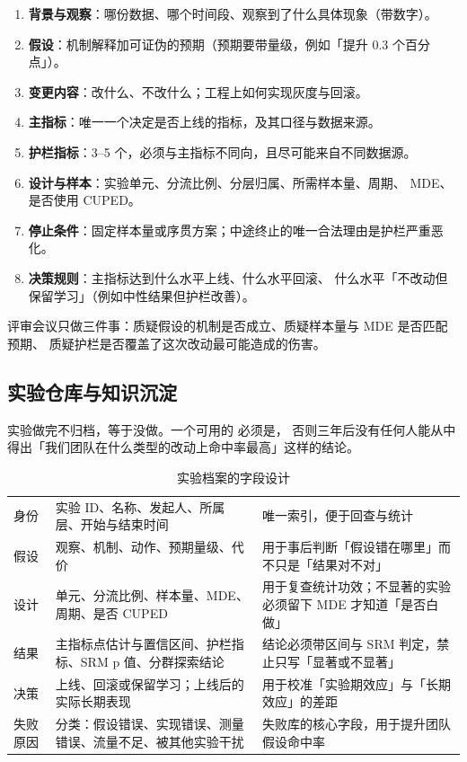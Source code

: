 \begin{toolbox}[一页纸实验文档模板]
\begin{enumerate}
  \item \textbf{背景与观察}：哪份数据、哪个时间段、观察到了什么具体现象（带数字）。
  \item \textbf{假设}：机制解释加可证伪的预期（预期要带量级，例如「提升 0.3 个百分点」）。
  \item \textbf{变更内容}：改什么、不改什么；工程上如何实现灰度与回滚。
  \item \textbf{主指标}：唯一一个决定是否上线的指标，及其口径与数据来源。
  \item \textbf{护栏指标}：3--5 个，必须与主指标不同向，且尽可能来自不同数据源。
  \item \textbf{设计与样本}：实验单元、分流比例、分层归属、所需样本量、周期、
        MDE、是否使用 CUPED。
  \item \textbf{停止条件}：固定样本量或序贯方案；中途终止的唯一合法理由是护栏严重恶化。
  \item \textbf{决策规则}：主指标达到什么水平上线、什么水平回滚、
        什么水平「不改动但保留学习」（例如中性结果但护栏改善）。
\end{enumerate}
评审会议只做三件事：质疑假设的机制是否成立、质疑样本量与 MDE 是否匹配预期、
质疑护栏是否覆盖了这次改动最可能造成的伤害。
\end{toolbox}

\subsection{实验仓库与知识沉淀}

实验做完不归档，等于没做。一个可用的
必须是，
否则三年后没有任何人能从中得出「我们团队在什么类型的改动上命中率最高」这样的结论。

\begin{table}[htbp]
\centering
\caption{实验档案的字段设计}
\label{tab:growth-archive}
\small
\begin{tabularx}{\textwidth}{L{2.4cm} L{4.2cm} Y}
\toprule
{} &  &  \\
\midrule
身份 & 实验 ID、名称、发起人、所属层、开始与结束时间 & 唯一索引，便于回查与统计 \\
\addlinespace
假设 & 观察、机制、动作、预期量级、代价 & 用于事后判断「假设错在哪里」而不只是「结果对不对」 \\
\addlinespace
设计 & 单元、分流比例、样本量、MDE、周期、是否 CUPED & 用于复查统计功效；不显著的实验必须留下 MDE 才知道「是否白做」 \\
\addlinespace
结果 & 主指标点估计与置信区间、护栏指标、SRM p 值、分群探索结论 & 结论必须带区间与 SRM 判定，禁止只写「显著或不显著」 \\
\addlinespace
决策 & 上线、回滚或保留学习；上线后的实际长期表现 & 用于校准「实验期效应」与「长期效应」的差距 \\
\addlinespace
失败原因 & 分类：假设错误、实现错误、测量错误、流量不足、被其他实验干扰 & 失败库的核心字段，用于提升团队假设命中率 \\
\bottomrule
\end{tabularx}
\end{table}

